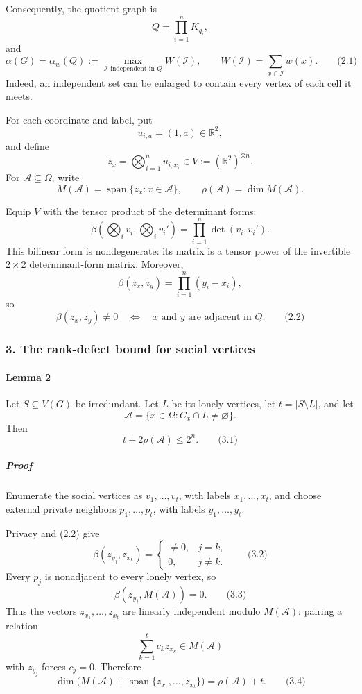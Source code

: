 \documentclass[
  11pt,
  a4paper,
]{article}
\begin{document}
Consequently, the quotient graph is \[
Q=\prod_{i=1}^{n}K_{q_i},
\] and \[
\alpha(G)=\alpha_w(Q):=
\max_{\mathcal I\text{ independent in }Q}W(\mathcal I),
\qquad
W(\mathcal I)=\sum_{x\in\mathcal I}w(x).
\qquad\text{(2.1)}
\] Indeed, an independent set can be enlarged to contain every vertex of
each cell it meets.

For each coordinate and label, put \[
u_{i,a}=(1,a)\in\mathbb R^2,
\] and define \[
z_x=\bigotimes_{i=1}^{n}u_{i,x_i}
\in V:=(\mathbb R^2)^{\otimes n}.
\] For \(\mathcal A\subseteq\Omega\), write \[
M(\mathcal A)=\operatorname{span}\{z_x:x\in\mathcal A\},
\qquad
\rho(\mathcal A)=\dim M(\mathcal A).
\]

Equip \(V\) with the tensor product of the determinant forms: \[
\beta\!\left(\bigotimes_i v_i,\bigotimes_i v_i'\right)
=\prod_{i=1}^{n}\det(v_i,v_i').
\] This bilinear form is nondegenerate: its matrix is a tensor power of
the invertible \(2\times2\) determinant-form matrix. Moreover, \[
\beta(z_x,z_y)=\prod_{i=1}^{n}(y_i-x_i),
\] so \[
\beta(z_x,z_y)\ne0
\quad\Longleftrightarrow\quad
x\text{ and }y\text{ are adjacent in }Q.
\qquad\text{(2.2)}
\]

\subsubsection{3. The rank-defect bound for social
vertices}\label{the-rank-defect-bound-for-social-vertices}

\paragraph{Lemma 2}\label{lemma-2}

Let \(S\subseteq V(G)\) be irredundant. Let \(L\) be its lonely
vertices, let \(t=|S\setminus L|\), and let \[
\mathcal A=\{x\in\Omega:C_x\cap L\ne\varnothing\}.
\] Then \[
\boxed{t+2\rho(\mathcal A)\le 2^n.}
\qquad\text{(3.1)}
\]

\subparagraph{Proof}\label{proof-1}

Enumerate the social vertices as \(v_1,\ldots,v_t\), with labels
\(x_1,\ldots,x_t\), and choose external private neighbors
\(p_1,\ldots,p_t\), with labels \(y_1,\ldots,y_t\).

Privacy and (2.2) give \[
\beta(z_{y_j},z_{x_k})=
\begin{cases}
\ne0,&j=k,\\
0,&j\ne k.
\end{cases}
\qquad\text{(3.2)}
\] Every \(p_j\) is nonadjacent to every lonely vertex, so \[
\beta(z_{y_j},M(\mathcal A))=0.
\qquad\text{(3.3)}
\] Thus the vectors \(z_{x_1},\ldots,z_{x_t}\) are linearly independent
modulo \(M(\mathcal A)\): pairing a relation \[
\sum_{k=1}^{t}c_kz_{x_k}\in M(\mathcal A)
\] with \(z_{y_j}\) forces \(c_j=0\). Therefore \[
\dim\bigl(M(\mathcal A)+\operatorname{span}\{z_{x_1},\ldots,z_{x_t}\}\bigr)
=\rho(\mathcal A)+t.
\qquad\text{(3.4)}
\]
\end{document}
